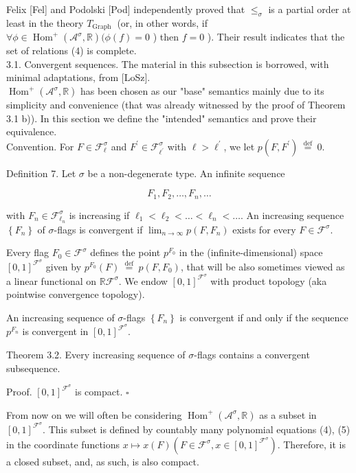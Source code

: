 \documentclass[10pt]{article}
\begin{document}
Felix [Fel] and Podolski [Pod] independently proved that $\leq_{\sigma}$ is a partial order at least in the theory $T_{\text {Graph }}$ (or, in other words, if $\forall \phi \in \operatorname{Hom}^{+}\left(\mathcal{A}^{\sigma}, \mathbb{R}\right)(\phi(f)=0$ ) then $f=0$ ). Their result indicates that the set of relations (4) is complete.\\[0pt]
3.1. Convergent sequences. The material in this subsection is borrowed, with minimal adaptations, from [LoSz].\\
$\operatorname{Hom}^{+}\left(\mathcal{A}^{\sigma}, \mathbb{R}\right)$ has been chosen as our "base" semantics mainly due to its simplicity and convenience (that was already witnessed by the proof of Theorem 3.1 b)). In this section we define the "intended" semantics and prove their equivalence.\\
Convention. For $F \in \mathcal{F}_{\ell}^{\sigma}$ and $F^{\prime} \in \mathcal{F}_{\ell^{\prime}}^{\sigma}$ with $\ell>\ell^{\prime}$, we let $p\left(F, F^{\prime}\right) \stackrel{\text { def }}{=} 0$.

Definition 7. Let $\sigma$ be a non-degenerate type. An infinite sequence

$$
F_{1}, F_{2}, \ldots, F_{n}, \ldots
$$

with $F_{n} \in \mathcal{F}_{\ell_{n}}^{\sigma}$ is increasing if $\ell_{1}<\ell_{2}<\ldots<\ell_{n}<\ldots$. An increasing sequence $\left\{F_{n}\right\}$ of $\sigma$-flags is convergent if $\lim _{n \rightarrow \infty} p\left(F, F_{n}\right)$ exists for every $F \in \mathcal{F}^{\sigma}$.

Every flag $F_{0} \in \mathcal{F}^{\sigma}$ defines the point $p^{F_{0}}$ in the (infinite-dimensional) space $[0,1]^{\mathcal{F}^{\sigma}}$ given by $p^{F_{0}}(F) \stackrel{\text { def }}{=} p\left(F, F_{0}\right)$, that will be also sometimes viewed as a linear functional on $\mathbb{R} \mathcal{F}^{\sigma}$. We endow $[0,1]^{\mathcal{F}^{\sigma}}$ with product topology (aka pointwise convergence topology).

An increasing sequence of $\sigma$-flags $\left\{F_{n}\right\}$ is convergent if and only if the sequence $p^{F_{n}}$ is convergent in $[0,1]^{\mathcal{F}^{\sigma}}$.

Theorem 3.2. Every increasing sequence of $\sigma$-flags contains a convergent subsequence.

Proof. $[0,1]^{\mathcal{F}^{\sigma}}$ is compact. \(\square\)

From now on we will often be considering $\operatorname{Hom}^{+}\left(\mathcal{A}^{\sigma}, \mathbb{R}\right)$ as a subset in $[0,1]^{\mathcal{F}^{\sigma}}$. This subset is defined by countably many polynomial equations (4), (5) in the coordinate functions $x \mapsto x(F)\left(F \in \mathcal{F}^{\sigma}, x \in[0,1]^{\mathcal{F}^{\sigma}}\right)$. Therefore, it is a closed subset, and, as such, is also compact.
\end{document}
